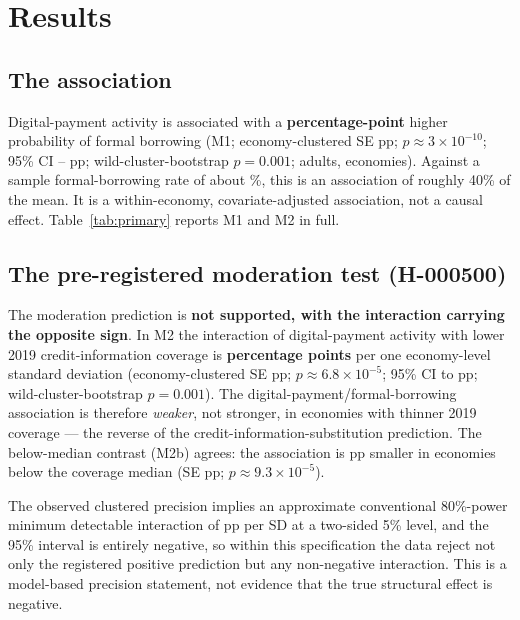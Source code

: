 \section{Results}

\subsection{The association}

Digital-payment activity is associated with a \textbf{\MOneBeta{} percentage-point} higher
probability of formal borrowing (M1; economy-clustered SE \MOneSE{} pp;
$p\approx 3\times10^{-10}$; 95\% CI \MOneCIlo{}--\MOneCIhi{} pp; wild-cluster-bootstrap
$p=0.001$; \NAdults{} adults, \NEconomies{} economies). Against a sample formal-borrowing
rate of about \FormalBorrowMean\%, this is an association of roughly 40\% of the mean. It is
a within-economy, covariate-adjusted association, not a causal effect.
Table~\ref{tab:primary} reports M1 and M2 in full.



\subsection{The pre-registered moderation test (H-000500)}

The moderation prediction is \textbf{not supported, with the interaction carrying the
opposite sign}. In M2 the interaction of digital-payment activity with lower 2019
credit-information coverage is \textbf{\MTwoBetaThree{} percentage points} per one
economy-level standard deviation (economy-clustered SE \MTwoBetaThreeSE{} pp;
$p\approx 6.8\times10^{-5}$; 95\% CI \MTwoBetaThreeCIlo{} to \MTwoBetaThreeCIhi{} pp;
wild-cluster-bootstrap $p=0.001$). The digital-payment/formal-borrowing association is
therefore \emph{weaker}, not stronger, in economies with thinner 2019 coverage --- the
reverse of the credit-information-substitution prediction. The below-median contrast (M2b)
agrees: the association is \MTwoBmedianBeta{} pp smaller in economies below the coverage
median (SE \MTwoBmedianSE{} pp; $p\approx 9.3\times10^{-5}$).

The observed clustered precision implies an approximate conventional 80\%-power minimum
detectable interaction of \MDEpp{} pp per SD at a two-sided 5\% level, and the 95\% interval
is entirely negative, so within this specification the data reject not only the registered
positive prediction but any non-negative interaction. This is a model-based precision
statement, not evidence that the true structural effect is negative.

